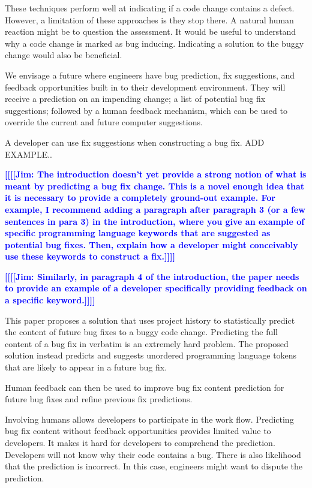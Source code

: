 \documentclass[10pt, conference, letterpaper, compsocconf]{IEEEtran}
\newcommand{\todoc}[2]{{\textcolor{#1} {\textbf{[[#2]]}}}}
\newcommand{\todoblue}[1]{\todoc{blue}{\textbf{[[#1]]}}}
\newcommand{\jim}[1]{\todoblue{Jim: #1}}
\begin{document}
These techniques perform well at indicating if a code change contains
a defect. However, a limitation of these approaches is they stop there.
A natural human reaction might be to question the assessment. It would
be useful to understand why a code change is marked as bug inducing.
Indicating a solution to the buggy change would also be beneficial.

We envisage a future where engineers have bug prediction, fix suggestions, and feedback opportunities built in to their development environment.
They will receive a prediction on an impending change; a list of potential
bug fix suggestions; followed
by a human feedback mechanism, which can be used to override the current
and future computer suggestions.

A developer can use fix suggestions when constructing a bug fix. ADD EXAMPLE.. 


\jim{The introduction doesn't yet provide a strong notion of what is meant by predicting a bug fix change. This is a novel enough idea that it is necessary to provide a completely ground-out example. For example, I recommend adding a paragraph after paragraph 3 (or a few sentences in para 3) in the introduction, where you give an example of specific programming language keywords that are suggested as potential bug fixes. Then, explain how a developer might conceivably use these keywords to construct a fix.}

\jim{Similarly, in paragraph 4 of the introduction, the paper needs to provide an example of a developer specifically providing feedback on a specific keyword.}

This paper proposes a solution that uses project history to statistically predict
the content of future bug fixes to a buggy code change. Predicting the full content of a
bug fix in verbatim is an extremely hard problem. The proposed solution
instead predicts and suggests unordered programming language tokens
that are likely to appear in a future bug fix.

Human feedback can then be used to improve bug fix content prediction
for future bug fixes and refine previous fix predictions. 

Involving humans allows developers to participate in the work
flow. Predicting bug fix content without feedback opportunities provides
limited value to developers. It makes it hard for developers to comprehend
the prediction. Developers will not know why their code contains a
bug. There is also likelihood that the prediction is incorrect. In
this case, engineers might want to dispute the prediction.
\end{document}
